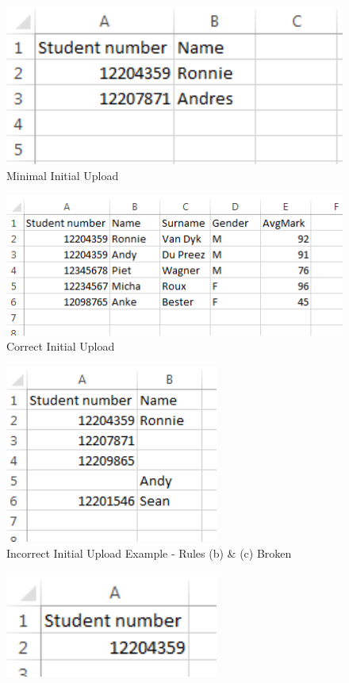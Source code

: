 \begin{enumerate}
\begin{itemize}
\begin{figure}[H]
	\centering
	\includegraphics[width=13cm]{./graphics/MinInitial.png}\par
	\caption{Minimal Initial Upload}
\end{figure}
 \begin{figure}[H] 
	\centering
	\includegraphics[width=13cm]{./graphics/CorrectInitial.png}\par
	\caption{Correct Initial Upload}
\end{figure}
 \begin{figure}[H] 
	\centering
	\includegraphics[width=7cm]{./graphics/IncorrectInitial.png}\par
	\caption{Incorrect Initial Upload Example - Rules (b) \& (c) Broken}
\end{figure}
 \begin{figure}[H] 
	\centering
	\includegraphics[width=7cm]{./graphics/IncorrectInitial1.png}\par

\end{figure}
\end{itemize}
\end{enumerate}
